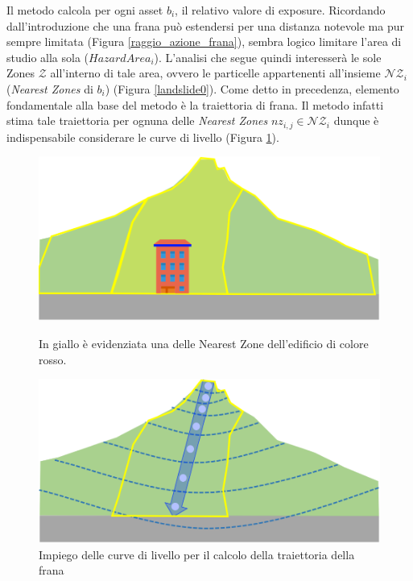 Il metodo calcola per ogni asset $b_i$, il relativo valore di exposure. Ricordando dall'introduzione che una frana può estendersi per una distanza notevole ma pur sempre limitata (Figura \ref{raggio_azione_frana}), sembra logico limitare l'area di studio alla sola ($HazardArea_i$). L'analisi che segue quindi interesserà le sole Zones $\mathcal{Z}$ all'interno di tale area, ovvero le particelle appartenenti all'insieme $\mathcal{NZ}_i$ (\textit{Nearest Zones} di $b_i$) (Figura \ref{landslide0}).
Come detto in precedenza, elemento fondamentale alla base del metodo è la  traiettoria di frana. Il metodo infatti stima tale traiettoria per ognuna delle \textit{Nearest Zones} $nz_{i,j} \in \mathcal{NZ}_i$ dunque è indispensabile considerare le curve di livello  (Figura \ref{landslide1}). 

\begin{figure}[h]
	\hspace{0.05\linewidth}
	\begin{minipage}[t]{0.4\linewidth}
		\centering
		\includegraphics[width=\textwidth]{images/landslide0}
		\caption{In giallo è evidenziata una delle Nearest Zone dell'edificio di colore rosso.}
		\label{landslide0}
	\end{minipage}
	\hspace{0.05\linewidth}
	\begin{minipage}[t]{0.4\linewidth}
		\centering
		\includegraphics[width=\textwidth]{images/landslide1}
		\caption{Impiego delle curve di livello per il calcolo della traiettoria della frana}
		\label{landslide1}
	\end{minipage}
\end{figure}

